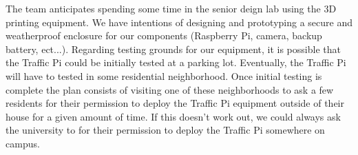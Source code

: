 The team anticipates spending some time in the senior deign lab using the 3D printing equipment. We have intentions of designing and prototyping a secure and weatherproof enclosure for our components (Raspberry Pi, camera, backup battery, ect...). Regarding testing grounds for our equipment, it is possible that the Traffic Pi could be initially tested at a parking lot. Eventually, the Traffic Pi will have to tested in some residential neighborhood. Once initial testing is complete the plan consists of visiting one of these neighborhoods to ask a few residents for their permission to deploy the Traffic Pi equipment outside of their house for a given amount of time. If this doesn't work out, we could always ask the university to for their permission to deploy the Traffic Pi somewhere on campus.